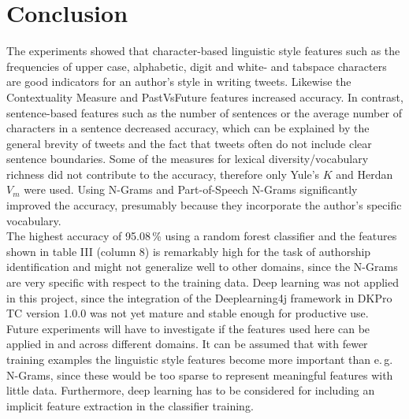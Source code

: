 \documentclass[journal, a4paper, 12pt]{IEEEtran}
\begin{document}
\section{Conclusion}
The experiments showed that character-based linguistic style features such as the frequencies of upper case, alphabetic, digit and white- and tabspace characters are good indicators for an author's style in writing tweets. Likewise the Contextuality Measure and PastVsFuture features increased accuracy. In contrast, sentence-based features such as the number of sentences or the average number of characters in a sentence decreased accuracy, which can be explained by the general brevity of tweets and the fact that tweets often do not include clear sentence boundaries. Some of the measures for lexical diversity/vocabulary richness did not contribute to the accuracy, therefore only Yule's $K$ and Herdan $V_m$ were used. Using N-Grams and Part-of-Speech N-Grams significantly improved the accuracy, presumably because they incorporate the author's specific vocabulary.\\
The highest accuracy of 95.08\,\% using a random forest classifier and the features shown in table III (column 8) is remarkably high for the task of authorship identification and might not generalize well to other domains, since the N-Grams are very specific with respect to the training data. Deep learning was not applied in this project, since the integration of the Deeplearning4j framework in DKPro TC version 1.0.0 was not yet mature and stable enough for productive use.\\
Future experiments will have to investigate if the features used here can be applied in and across different domains. It can be assumed that with fewer training examples the linguistic style features become more important than e.\,g. N-Grams, since these would be too sparse to represent meaningful features with little data. Furthermore, deep learning has to be considered for including an implicit feature extraction in the classifier training.
\end{document}
